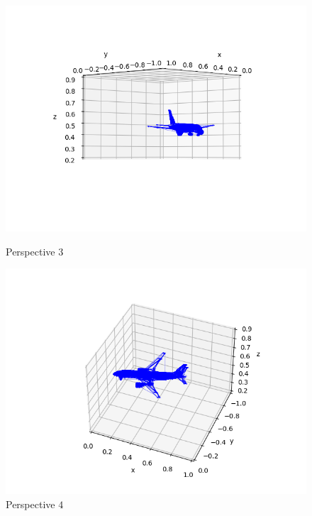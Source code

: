\begin{figure}
  \centering
  \begin{minipage}{.49\textwidth}
    \centering
    \includegraphics[width=\textwidth]{./figures/03-warped-cad-3.png}
    \caption*{Perspective $3$}
  \end{minipage}
  \hfill
  \begin{minipage}{.49\textwidth}
    \centering
    \includegraphics[width=\textwidth]{./figures/03-warped-cad-1.png}
    \caption*{Perspective $4$}
  \end{minipage}
\end{figure}

